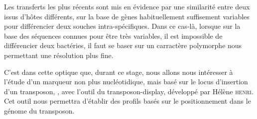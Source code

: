 Les transferts les plus récents sont mis en évidence par une similarité entre deux  issus d’hôtes différents, sur la base de gènes habituellement suffisement variables pour différencier deux souches intra-spécifiques.
Dans ce cas-là, lorsque sur la base des séquences connues pour être très variables, il est impossible de différencier deux bactéries, il faut se baser sur un carractère polymorphe nous permettant une résolution plus fine.

C’est dans cette optique que, durant ce stage, nous allons nous intéresser à l’étude  d’un marqueur non plus nucléotidique, mais basé sur le locus d’insertion d’un transposon, , avec l’outil du transposon-display, développé par Hélène \textsc{henri}\cite{memHH}. 
Cet outil nous permettra d’établir des profils basés sur le positionnement dans le génome du transposon.